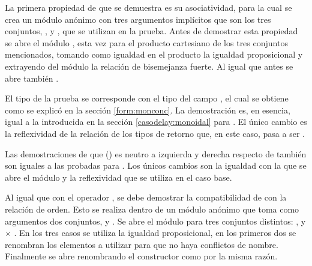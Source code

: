 \begin{AgdaAlign}

La primera propiedad de  que se demuestra es su asociatividad, para la cual se crea un módulo anónimo con tres argumentos implícitos que son los tres conjuntos, ,  y , que se utilizan en la prueba. Antes de demostrar esta propiedad se abre el módulo , esta vez para el producto cartesiano de los tres conjuntos mencionados, tomando como igualdad en el producto la igualdad proposicional y extrayendo del módulo la relación de bisemejanza fuerte. Al igual que antes se abre también .


El tipo de la prueba se corresponde con el tipo del campo , el cual se obtiene como se explicó en la sección \ref{form:monconc}. La demostración es, en esencia, igual a la introducida en la sección \ref{casodelay:monoidal} para . El único cambio es la reflexividad de la relación de los tipos de retorno que, en este caso, pasa a ser . 

Las demostraciones de que () es neutro a izquierda y derecha respecto de  también son iguales a las probadas para . Los únicos cambios son la igualdad con la que se abre el módulo  y la reflexividad que se utiliza en el caso base. 



Al igual que con el operador , se debe demostrar la compatibilidad de  con la relación de orden. Esto se realiza dentro de un módulo anónimo que toma como argumentos dos conjuntos,  y . Se abre el módulo  para tres conjuntos distintos: ,  y  $\times$ . En los tres casos se utiliza la igualdad proposicional, en los primeros dos se renombran los elementos a utilizar para que no haya conflictos de nombre. Finalmente se abre  renombrando el constructor  como  por la misma razón.


\end{AgdaAlign}
